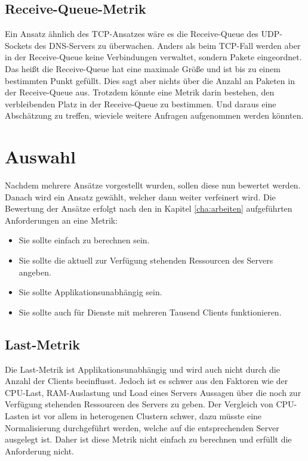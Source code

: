 \documentclass[a4paper, 12pt, BCOR10mm, DIV12, toc=bibliography, toc=listof, german]{scrbook}
\begin{document}

		\subsection*{Receive-Queue-Metrik} %
	
		Ein Ansatz ähnlich des TCP-Ansatzes wäre es die Receive-Queue des UDP-Sockets des DNS-Servers zu
		überwachen. Anders als beim TCP-Fall werden aber in der Receive-Queue keine Verbindungen
		verwaltet, sondern Pakete eingeordnet. Das heißt die Receive-Queue hat eine maximale Größe und
		ist bis zu einem bestimmten Punkt gefüllt. Dies sagt aber nichts über die Anzahl an Paketen in
		der Receive-Queue aus. Trotzdem könnte eine Metrik darin bestehen, den verbleibenden Platz in
		der Receive-Queue zu bestimmen. Und daraus eine Abschätzung zu treffen, wieviele weitere
		Anfragen aufgenommen werden könnten.

		

		\section{Auswahl} %
		\label{sec:auswahl}

		Nachdem mehrere Ansätze vorgestellt wurden, sollen diese nun bewertet werden. Danach wird ein
		Ansatz gewählt, welcher dann weiter verfeinert wird. Die Bewertung der Ansätze erfolgt nach den
		in Kapitel \ref{cha:arbeiten} aufgeführten Anforderungen an eine Metrik:

		\begin{itemize}
			\item Sie sollte einfach zu berechnen sein.
			\item Sie sollte die aktuell zur Verfügung stehenden Ressourcen des Servers angeben.
			\item Sie sollte Applikationsunabhängig sein.
			\item Sie sollte auch für Dienste mit mehreren Tausend Clients funktionieren.
		\end{itemize}

		\subsection*{Last-Metrik} %

		Die Last-Metrik ist Applikationsunabhängig und wird auch nicht durch die Anzahl der Clients
		beeinflusst. Jedoch ist es schwer aus den Faktoren wie der CPU-Last, RAM-Auslastung und Load
		eines Servers Aussagen über die noch zur Verfügung stehenden Ressourcen des Servers zu geben.
		Der Vergleich von CPU-Lasten ist vor allem in heterogenen Clustern schwer, dazu müsste eine
		Normalisierung durchgeführt werden, welche auf die entsprechenden Server ausgelegt ist. Daher
		ist diese Metrik nicht einfach zu berechnen und erfüllt die Anforderung nicht.
		
\end{document}
